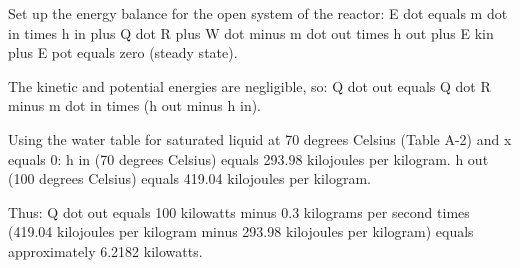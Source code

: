 Set up the energy balance for the open system of the reactor:  
E dot equals m dot in times h in plus Q dot R plus W dot minus m dot out times h out plus E kin plus E pot equals zero (steady state).  

The kinetic and potential energies are negligible, so:  
Q dot out equals Q dot R minus m dot in times (h out minus h in).  

Using the water table for saturated liquid at 70 degrees Celsius (Table A-2) and x equals 0:  
h in (70 degrees Celsius) equals 293.98 kilojoules per kilogram.  
h out (100 degrees Celsius) equals 419.04 kilojoules per kilogram.  

Thus:  
Q dot out equals 100 kilowatts minus 0.3 kilograms per second times (419.04 kilojoules per kilogram minus 293.98 kilojoules per kilogram) equals approximately 6.2182 kilowatts.